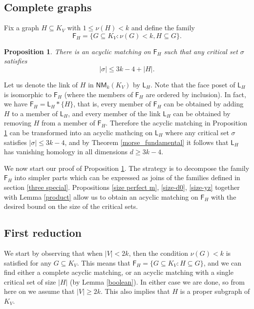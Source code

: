 \documentclass[10pt]{amsart}
\newtheorem{prop}[thm]{Proposition}
\theoremstyle{definition}
\begin{document}
	\subsection{Complete graphs} \label{complete case}
	Fix a graph $H\subseteq K_V$ with $1\leq \nu(H)<k$ and 
	define the family
	\[\mathsf{F}_H = \{ G\subseteq K_V : \nu(G)< k, H\subseteq G\}. \]
	\begin{prop}\label{special case}
		There is an acyclic matching on $\mathsf{F}_H$ such that any critical set $\sigma$ satisfies 
		\[|\sigma| \leq 3k-4+|H|.\]
	\end{prop}
	
	Let us denote the link of $H$ in $\mathsf{NM}_k(K_V)$ by $\mathsf{L}_H$.
	Note that the face poset of $\mathsf{L}_H$ is isomorphic to $\mathsf{F}_H$ (where the members of $\mathsf{F}_H$ are ordered by inclusion). In fact, we have $\mathsf{F}_H = \mathsf{L}_H*\{H\}$, that is, every member of $\mathsf{F}_H$ can be obtained by adding $H$ to a member of $\mathsf{L}_H$, and every member of the link $\mathsf{L}_H$ can be obtained by removing $H$ from a member of $\mathsf{F}_H$. Therefore the acyclic matching in Proposition \ref{special case} can be transformed into an acyclic mathcing on $\mathsf{L}_H$ where any critical set $\sigma$ satisfies $|\sigma|\leq 3k-4$,
	and by Theorem \ref{morse_fundamental} it follows that $\mathsf{L}_H$ has vanishing homology in all dimensions $d\geq 3k-4$.
	
	\medskip
	
	We now start our proof of Proposition \ref{special case}. 
	The strategy is to decompose the family $\mathsf{F}_H$ into simpler parts which can be expressed as joins of the families defined in section \ref{three special}. Propositions \ref{size perfect m}, \ref{size-d0}, \ref{size-yz} together with 
	Lemma \ref{product} allow us to obtain an acyclic matching on $\mathsf{F}_H$ with the desired bound on the size of the critical sets.
	
	\subsection*{First reduction}
	We start by observing that when $|V|<2k$, then the condition $\nu(G)<k$ is satisfied for any $G\subseteq K_V$. This means that $\mathsf{F}_H = \{G\subseteq K_V : H\subseteq G\}$, and we can find either a complete acyclic matching, or an acyclic matching with a single critical set of size $|H|$ (by Lemma \ref{boolean}). In either case we are done, so from here on we assume that $|V|\geq 2k$. This also implies that $H$ is a proper subgraph of $K_V$. 
	
\end{document}
